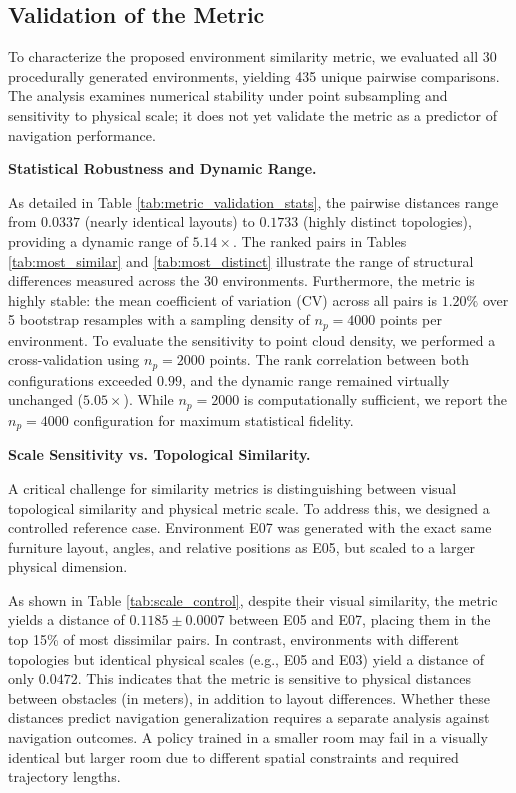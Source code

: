 \documentclass[robotics,article,submit,pdftex,moreauthors]{Definitions/mdpi}
\begin{document}
\subsection{Validation of the Metric}\label{sec:metric_validation}

To characterize the proposed environment similarity metric, we evaluated all 30 procedurally generated environments, yielding 435 unique pairwise comparisons. The analysis examines numerical stability under point subsampling and sensitivity to physical scale; it does not yet validate the metric as a predictor of navigation performance. 

\textbf{Statistical Robustness and Dynamic Range.}

As detailed in Table \ref{tab:metric_validation_stats}, the pairwise distances range from \(0.0337\) (nearly identical layouts) to \(0.1733\) (highly distinct topologies), providing a dynamic range of \(5.14\times\). The ranked pairs in Tables \ref{tab:most_similar} and \ref{tab:most_distinct} illustrate the range of structural differences measured across the 30 environments. Furthermore, the metric is highly stable: the mean coefficient of variation (CV) across all pairs is \(1.20\%\) over 5 bootstrap resamples with a sampling density of \(n_p=4000\) points per environment. To evaluate the sensitivity to point cloud density, we performed a cross-validation using \(n_p=2000\) points. The rank correlation between both configurations exceeded \(0.99\), and the dynamic range remained virtually unchanged (\(5.05\times\)). While \(n_p=2000\) is computationally sufficient, we report the \(n_p=4000\) configuration for maximum statistical fidelity.

\textbf{Scale Sensitivity vs. Topological Similarity.}

A critical challenge for similarity metrics is distinguishing between visual topological similarity and physical metric scale. To address this, we designed a controlled reference case. Environment E07 was generated with the exact same furniture layout, angles, and relative positions as E05, but scaled to a larger physical dimension. 

As shown in Table \ref{tab:scale_control}, despite their visual similarity, the metric yields a distance of \(0.1185 \pm 0.0007\) between E05 and E07, placing them in the top 15\% of most dissimilar pairs. In contrast, environments with different topologies but identical physical scales (e.g., E05 and E03) yield a distance of only \(0.0472\). This indicates that the metric is sensitive to physical distances between obstacles (in meters), in addition to layout differences. Whether these distances predict navigation generalization requires a separate analysis against navigation outcomes. A policy trained in a smaller room may fail in a visually identical but larger room due to different spatial constraints and required trajectory lengths.
\end{document}
